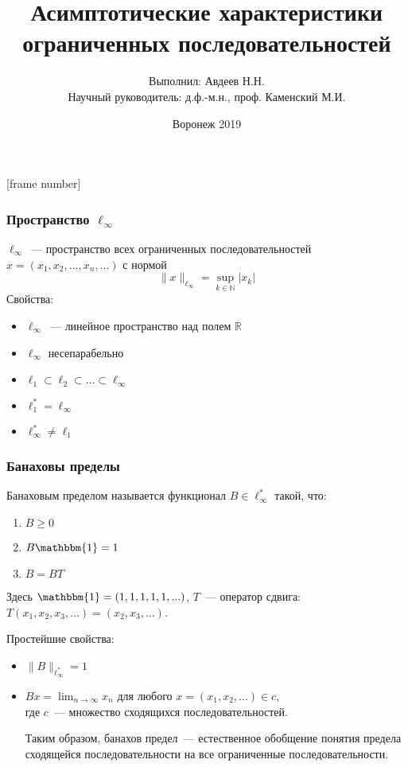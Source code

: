\documentclass[10pt,pdf,hyperref={unicode},aspectratio=169]{beamer}
\theoremstyle{definition}
\begin{document}
{
	
}


\title{Асимптотические характеристики \\ ограниченных последовательностей}
\author{Выполнил: Авдеев Н.Н. \\ Научный руководитель: д.ф.-м.н., проф. Каменский М.И.}
\date{Воронеж 2019}

\maketitle

[frame number]

\begin{frame}
	\frametitle{Пространство $\ell_\infty$}
	$\ell_\infty$~--- пространство всех ограниченных последовательностей
	$x=(x_1, x_2, ..., x_n, ...)$
	с нормой
	$$
		\|x\|_{\ell_\infty} = \sup_{k\in\mathbb{N}} |x_k|
	$$
	{Свойства:}

	\begin{itemize}
		\item
			$\ell_\infty$~--- линейное пространство над полем $\mathbb{R}$
		\item
			$\ell_\infty$  несепарабельно
		\item
			$\ell_1 \subset \ell_2 \subset \dots \subset \ell_\infty$
		\item
			$\ell_1^* = \ell_\infty$
		\item
			$\ell_\infty^* \neq \ell_1$
	\end{itemize}
\end{frame}

\begin{frame}\frametitle{Банаховы пределы}
	Банаховым пределом называется функционал $B\in \ell_\infty^*$ такой, что:
	\begin{enumerate}
		\item
			$B \geqslant 0$
		\item
			$B\mathbbm{1} = 1$
		\item
			$B=BT$
	\end{enumerate}
	Здесь $\mathbbm{1}=(1,1,1,1,1,...)$,
	$T$~--- оператор сдвига: $T(x_1, x_2, x_3, ...) = (x_2, x_3, ...)$.

	Простейшие свойства:
	\begin{itemize}
		\item
			$\|B\|_{\ell_\infty^*} = 1$
		\item
			$Bx = \lim_{n\to\infty} x_n$ для любого $x=(x_1, x_2, ...) \in c$,
			\\
			где $c$~--- множество сходящихся последовательностей.

			Таким образом,
			банахов предел~--- естественное обобщение понятия предела сходящейся последовательности
			на все ограниченные последовательности.
	\end{itemize}
\end{frame}
\end{document}
